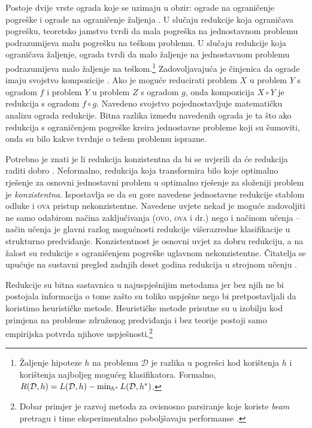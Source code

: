 Postoje dvije vrste ograda koje se uzimaju u obzir: ograde na ograničenje
pogreške  i ograde na ograničenje žaljenja . U slučaju redukcije koja ograničava pogrešku, teoretsko jamstvo tvrdi
da mala pogreška na jednostavnom problemu podrazumijeva malu pogrešku na teškom
problemu. U slučaju redukcije koja ograničava žaljenje, ograda tvrdi da malo
žaljenje na jednostavnom problemu podrazumijeva malo žaljenje na
teškom.\footnote{Žaljenje hipoteze $h$ na problemu $\mathcal{D}$ je razlika u
pogrešci kod korištenja $h$ i korištenja najboljeg mogućeg klasifikatora.
Formalno, $R(\mathcal{D}, h) = L(\mathcal{D}, h) - \min_{h\ssymbol{1}}
L(\mathcal{D}, h\ssymbol{1})$.} Zadovoljavajuća je činjenica da ograde imaju
svojstvo kompozicije \citep{beygelzimer2005error}. Ako je moguće reducirati
problem $X$ u problem $Y$ s ogradom $f$ i problem $Y$ u problem $Z$ s ogradom
$g$, onda kompozicija $X \circ Y$ je redukcija s ogradom $f \circ g$. Navedeno
svojstvo pojednostavljuje matematičku analizu ograda redukcije. Bitna razlika
između navedenih ograda je ta što ako redukcija s ograničenjem pogreške kreira
jednostavne probleme koji su šumoviti, onda su bilo kakve tvrdnje o težem
problemu isprazne.

Potrebno je znati je li redukcija konzistentna  da bi se
uvjerili da će redukcija raditi dobro \citep{beygelzimer2009error,
daume15reductions}. Neformalno, redukcija koja transformira bilo koje optimalno
rješenje za osnovni jednostavni problem u optimalno rješenje za složeniji
problem je \textit{konzistentna}. Ispostavlja se da su gore navedene jednostavne
redukcije stablom odluke i \textsc{ova} pristup nekonzistentne. Navedene uvjete
nekad je moguće zadovoljiti ne samo odabirom načina zaključivanja (\textsc{ovo},
\textsc{ova} i dr.) nego i načinom učenja \citep{abe2004iterative,
beygelzimer2005weighted} -- način učenja je glavni razlog mogućnosti redukcije
višerazredne klasifikacije u strukturno predviđanje. Konzistentnost je osnovni
uvjet za dobru redukciju, a na žalost su redukcije s ograničenjem pogreške
uglavnom nekonzistentne. Čitatelja se upućuje na sustavni pregled zadnjih deset
godina redukcija u strojnom učenju \citep{daume15reductions}.

Redukcije su bitna sastavnica u najuspješnijim \lts{} metodama jer bez njih ne
bi postojala informacija o tome zašto su toliko uspješne nego bi pretpostavljali
da koristimo heurističke metode. Heurističke metode prisutne su u izobilju kod
primjena na probleme združenog predviđanja i bez teorije postoji samo empirijska
potvrda njihove uspješnosti.\footnote{Dobar primjer je razvoj metoda za
ovisnosno parsiranje koje koriste \textit{beam} pretragu i time eksperimentalno
poboljšavaju performanse \citep{zhang2011transition, bohnet2012transition}.}
